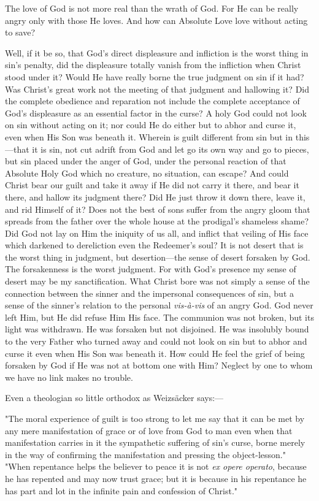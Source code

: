 \documentclass[draft]{ptfdoc}
\begin{document}
The love of God is not more real than the wrath of God. 
For He can be really angry only with those He loves. 
And how can Absolute Love love without acting to save? 

Well, if it be so, that God's direct displeasure and 
infliction is the worst thing in sin's penalty, did the displeasure 
totally vanish from the infliction when Christ 
stood under it? Would He have really borne the true 
judgment on sin if it had? Was Christ's great work not 
the meeting of that judgment and hallowing it? Did 
the complete obedience and reparation not include the 
complete acceptance of God's displeasure as an essential 
factor in the curse? A holy God could not look on sin 
without acting on it; nor could He do either but to abhor 
and curse it, even when His Son was beneath it. Wherein 
is guilt different from sin but in this---that it is sin, not 
cut adrift from God and let go its own way and go to 
pieces, but sin placed under the anger of God, under the 
personal reaction of that Absolute Holy God which no 
creature, no situation, can escape? And could Christ bear 
our guilt and take it away if He did not carry it there, and 
bear it there, and hallow its judgment there? Did He 
just throw it down there, leave it, and rid Himself of it? 
Does not the best of sons suffer from the angry gloom that 
spreads from the father over the whole house at the 
prodigal's shameless shame? Did God not lay on Him the 
iniquity of us all, and inflict that veiling of His face which 
darkened to dereliction even the Redeemer's soul? It is 
not desert that is the worst thing in judgment, but desertion---the 
sense of desert forsaken by God. The forsakenness 
is the worst judgment. For with God's presence 
my sense of desert may be my sanctification. What 
Christ bore was not simply a sense of the connection 
between the sinner and the impersonal consequences of 
sin, but a sense of the sinner's relation to the personal 
\textit{vis-\`{a}-vis} of an angry God. God never left Him, but He 
did refuse Him His face. The communion was not broken, 
but its light was withdrawn. He was forsaken but not 
disjoined. He was insolubly bound to the very Father 
who turned away and could not look on sin but to abhor 
and curse it even when His Son was beneath it. How 
could He feel the grief of being forsaken by God if He 
was not at bottom one with Him? Neglect by one to 
whom we have no link makes no trouble. 

Even a theologian so little orthodox as Weizs\"{a}cker 
says:---

"The moral experience of guilt is too strong to let me 
say that it can be met by any mere manifestation of grace 
or of love from God to man even when that manifestation 
carries in it the sympathetic suffering of sin's curse, borne 
merely in the way of confirming the manifestation and 
pressing the object-lesson." "When repentance helps the 
believer to peace it is not \textit{ex opere operato}, because he has 
repented and may now trust grace; but it is because in 
his repentance he has part and lot in the infinite pain and 
confession of Christ." 
\end{document}
